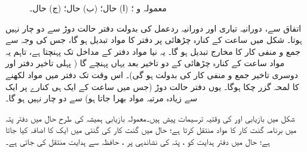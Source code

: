 \begin{figure}
\begin{subfigure}{0.30\textwidth}
\caption{}
\end{subfigure}
\caption{
معمولہ   و   ؛ (ا)  حال؛ (ب)  حال؛ (ج)  حال۔
}
\label{شکل_کمپیوٹر_جمع_اور_منفی}
\end{figure}

اتفاق سے،   دورانیہ تیاری اور  دورانیہ ردعمل  کی بدولت دفتر  حالت دوڑ سے دو چار نہیں ہوتا۔ شکل  میں  ساعت کے  کنارہ چڑھائی  پر دفتر  کا  مواد تبدیل ہو گا، جس کی وجہ سے جمع و منفی کار کا مخارج تبدیل ہو گا۔ یہ نیا مواد دفتر   کے مداخل تک پہنچتا ہے، تاہم یہ مواد  ساعت کے کنارہ چڑھائی کے دو  تاخیر  بعد  یہاں پہنچے گا ( پہلی تاخیر   دفتر  اور دوسری  تاخیر جمع و منفی کار کی بدولت ہو گی)۔ اس وقت تک دفتر   میں مواد لکھنے کا لمحہ گزر چکا ہوگا۔ یوں دفتر  حالت دوڑ (جس میں ساعت کے  ایک  ہی کنارے پر  ایک سے زیادہ مرتبہ مواد بھرا جاتا ہو)  سے دو چار نہیں ہو گا۔

شکل    میں بازیابی اور   کی وقتیہ ترسیمات  پیش ہیں۔معمولہ  بازیابی  ہمیشہ کی طرح  حال میں  دفتر پتہ میں برنامہ گنت کار کا مواد منتقل کرتا ہے؛  حال میں  گنت کار کی گنتی میں ایک کا اضافہ کیا جاتا ہے؛  حال میں دفتر ہدایت  کو ،  پتہ کی نشاندہی پر ، حافظہ سے ہدایت منتقل کی جاتی ہے۔

